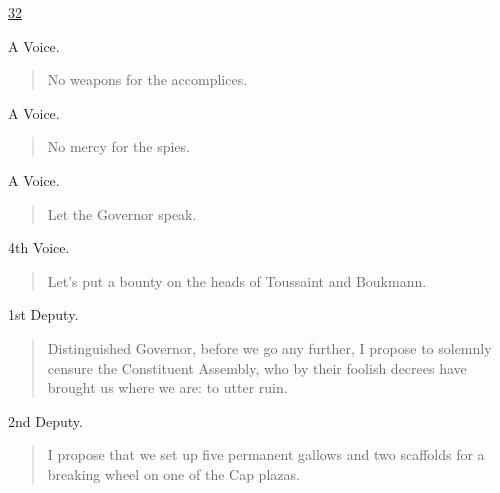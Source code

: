 \documentclass[letterpaper,article,12pt,oneside,notitlepage]{memoir}
\begin{document}
\clearpage

\href{http://cesaire.elotroalex.com/chiens/chiens/p032.html}{32}

\begin{center}A Voice.\end{center}

\begin{verse}
\hspace{1cm} No weapons for the accomplices. \\
\end{verse}

\begin{center}A Voice.\end{center}

\begin{verse}
\hspace{1cm} No mercy for the spies. \\
\end{verse}

\begin{center}A Voice.\end{center}

\begin{verse}
\hspace{1cm} Let the Governor speak. \\
\end{verse}

\begin{center}4th Voice.\end{center}

\begin{verse}
\hspace{1cm} Let's put a bounty on the heads of Toussaint and Boukmann. \\
\end{verse}

\begin{center}1st Deputy.\end{center}

\begin{verse}
\indent Distinguished Governor, before we go any further, I propose to solemnly censure the Constituent Assembly, who by their foolish decrees have brought us where we are: to utter ruin. \\
\end{verse}

\begin{center}2nd Deputy.\end{center}

\begin{verse}
\indent I propose that we set up five permanent gallows and two scaffolds for a breaking wheel on one of the Cap plazas. \\
\end{verse}
\end{document}
